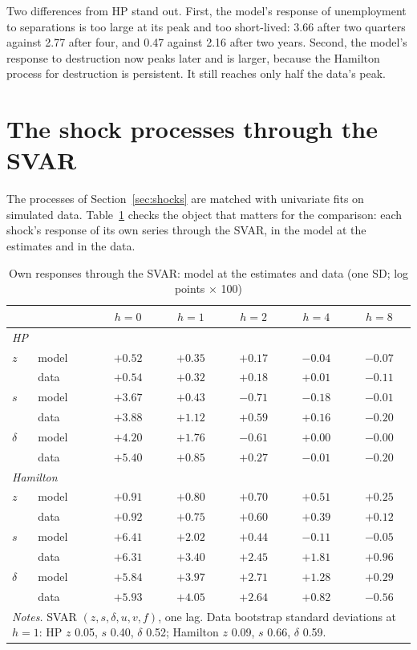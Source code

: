 \documentclass[authoryear, review, 12pt]{elsarticle}
\begin{document}
Two differences from HP stand out. First, the model's response of unemployment to separations is too large at its peak and too short-lived: 3.66 after two quarters against 2.77 after four, and 0.47 against 2.16 after two years. Second, the model's response to destruction now peaks later and is larger, because the Hamilton process for destruction is persistent. It still reaches only half the data's peak.

\section{The shock processes through the SVAR}\label{app:validation}

The processes of Section~\ref{sec:shocks} are matched with univariate fits on simulated data. Table~\ref{tab:own} checks the object that matters for the comparison: each shock's response of its own series through the SVAR, in the model at the estimates and in the data.

\begin{table}[H]
\centering
\caption{Own responses through the SVAR: model at the estimates and data (one SD; log points $\times$ 100)}\label{tab:own}
\small
\begin{tabular}{llccccc}
\toprule
 & & $h=0$ & $h=1$ & $h=2$ & $h=4$ & $h=8$ \\
\midrule
\multicolumn{7}{l}{\textit{HP}} \\
$z$ & model & $+0.52$ & $+0.35$ & $+0.17$ & $-0.04$ & $-0.07$ \\
 & data & $+0.54$ & $+0.32$ & $+0.18$ & $+0.01$ & $-0.11$ \\
$s$ & model & $+3.67$ & $+0.43$ & $-0.71$ & $-0.18$ & $-0.01$ \\
 & data & $+3.88$ & $+1.12$ & $+0.59$ & $+0.16$ & $-0.20$ \\
$\delta$ & model & $+4.20$ & $+1.76$ & $-0.61$ & $+0.00$ & $-0.00$ \\
 & data & $+5.40$ & $+0.85$ & $+0.27$ & $-0.01$ & $-0.20$ \\
\multicolumn{7}{l}{\textit{Hamilton}} \\
$z$ & model & $+0.91$ & $+0.80$ & $+0.70$ & $+0.51$ & $+0.25$ \\
 & data & $+0.92$ & $+0.75$ & $+0.60$ & $+0.39$ & $+0.12$ \\
$s$ & model & $+6.41$ & $+2.02$ & $+0.44$ & $-0.11$ & $-0.05$ \\
 & data & $+6.31$ & $+3.40$ & $+2.45$ & $+1.81$ & $+0.96$ \\
$\delta$ & model & $+5.84$ & $+3.97$ & $+2.71$ & $+1.28$ & $+0.29$ \\
 & data & $+5.93$ & $+4.05$ & $+2.64$ & $+0.82$ & $-0.56$ \\
\bottomrule
\multicolumn{7}{p{0.8\linewidth}}{\footnotesize \textit{Notes.} SVAR $(z,s,\delta,u,v,f)$, one lag. Data bootstrap standard deviations at $h=1$: HP $z$ 0.05, $s$ 0.40, $\delta$ 0.52; Hamilton $z$ 0.09, $s$ 0.66, $\delta$ 0.59.}
\end{tabular}
\end{table}
\end{document}
